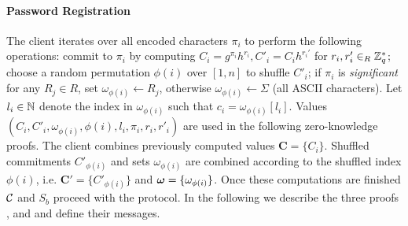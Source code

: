 \paragraph{Password Registration}
The client iterates over all encoded characters $\pi_i$ to perform the following operations:
commit to $\pi_i$ by computing $C_i=g^{\pi_i}h^{r_i}, C'_i=C_i h^{r_i'}$ for $r_i,r'_i\in_R\mathbb{Z}^\ast_q$;
choose a random permutation $\phi(i)$ over $[1,n]$ to shuffle $C'_i$;
if $\pi_i$ is \emph{significant} for any $R_j\in R$, set $\omega_{\phi(i)}\gets R_j$, otherwise $\omega_{\phi(i)}\gets\Sigma$ (all ASCII characters).
Let $l_i\in\mathbb{N}$ denote the index in $\omega_{\phi(i)}$ such that $c_i=\omega_{\phi(i)}[l_i]$.
Values $(C_i, C'_i,\omega_{\phi(i)}, \phi(i), l_i, \pi_i, r_i, r'_i)$ are used in the following zero-knowledge proofs.
The client combines previously computed values $\bm C = \{C_{i}\}$.
Shuffled commitments $C'_{\phi(i)}$ and sets $\omega_{\phi(i)}$ are combined according to the shuffled index $\phi(i)$, i.e. $\bm C' = \{C'_{\phi(i)}\}$ and $\boldsymbol{\mathbf{\omega}} = \{\omega_{\phi(i)}\}$.
Once these computations are finished $\mathcal{C}$ and $S_b$ proceed with the protocol.
In the following we describe the three proofs \PoM, \PoC and \PoS and define their messages.


